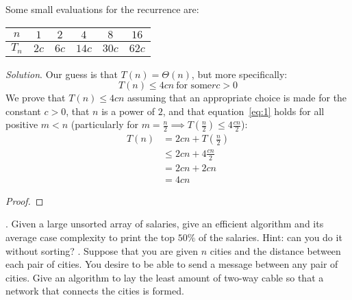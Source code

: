 \documentclass{scrartcl}
\begin{document}
\begin{flushleft}
    Some small evaluations for the recurrence are:
    \medskip
    \begin{center}
        \begin{tabular}{|c|c|c|c|c|c|}
            \hline
            $n$ & $1$ & $2$ & $4$ & $8$ & $16$\\
            \hline
            $T_n$ & $2c$ & $6c$ & $14c$ & $30c$ & $62c$\\
            \hline
        \end{tabular}
    \end{center}
    \medskip
    \textit{Solution}. Our guess is that $T(n) = \Theta(n)$, but more specifically:
    \begin{equation}
        T(n) \leq 4cn\ \text{for some}r c > 0
        \label{eq:1}
    \end{equation}
    We prove that $T(n) \leq 4cn$ assuming that an appropriate choice is made for the constant $c >
    0$, that $n$ is a power of $2$, and that equation~\ref{eq:1} holds for all positive $m < n$
    (particularly for $m = \frac{n}{2} \implies T(\frac{n}{2}) \leq 4\frac{cn}{2}$):
    \begin{align*}
        T(n) &= 2cn + T(\frac{n}{2})\\
        &\leq 2cn + 4\frac{cn}{2}\\
        &= 2cn + 2cn\\
        &= 4cn
    \end{align*}
    \begin{proof}
    \end{proof}
    . Given a large unsorted array of salaries, give an efficient algorithm and its average case
    complexity to print the top $50\%$ of the salaries. Hint: can you do it without sorting?
    . Suppose that you are given $n$ cities and the distance between each pair of cities. You
    desire to be able to send a message between any pair of cities. Give an algorithm to lay the
    least amount of two-way cable so that a network that connects the cities is formed.

\end{flushleft}
\end{document}
